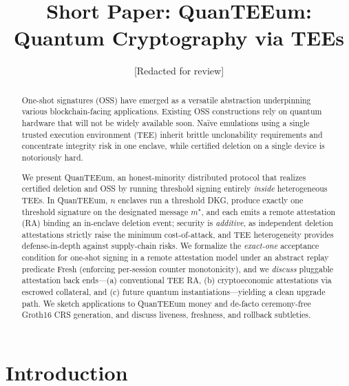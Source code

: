 \documentclass[runningheads,orivec]{llncs}
\newcommand{\prot}{\textsf{QuanTEEum}}
\begin{document}
\title{Short Paper: QuanTEEum: Quantum Cryptography via TEEs}
\author{[Redacted for review]}
\maketitle

\begin{abstract}
One-shot signatures (OSS) have emerged as a versatile abstraction underpinning various blockchain-facing applications. Existing OSS constructions rely on quantum hardware that will not be widely available soon. Naïve emulations using a single trusted execution environment (TEE) inherit brittle unclonability requirements and concentrate integrity risk in one enclave, while certified deletion on a single device is notoriously hard. 

We present \prot{}, an honest-minority distributed protocol that realizes certified deletion and OSS by running threshold signing entirely \emph{inside} heterogeneous TEEs. In \prot{}, $n$ enclaves run a threshold DKG, produce exactly one threshold signature on the designated message $m^{\star}$, and each emits a remote attestation (RA) binding an in-enclave deletion event; security is \emph{additive}, as independent deletion attestations strictly raise the minimum cost-of-attack, and TEE heterogeneity provides defense-in-depth against supply-chain risks. We formalize the \emph{exact-one} acceptance condition for one-shot signing in a remote attestation model under an abstract replay predicate \textsf{Fresh} (enforcing per-session counter monotonicity), and we \emph{discuss} pluggable attestation back ends—(a) conventional TEE RA, (b) cryptoeconomic attestations via escrowed collateral, and (c) future quantum instantiations—yielding a clean upgrade path. We sketch applications to QuanTEEum money and de-facto ceremony-free Groth16 CRS generation, and discuss liveness, freshness, and rollback subtleties. 
\end{abstract}

\section{Introduction}
\end{document}
